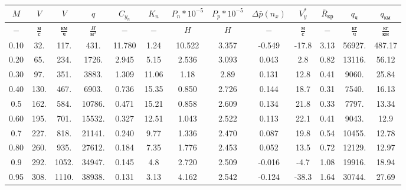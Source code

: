 \begin{tabular}{|c|c|c|c|c|c|c|c|c|c|c|c|c|}
\hline
$M$ & $V$ & $V$ & $q$ & $C_{y_n}$ & $K_n$ & $P_n*10^{-5}$ & $P_p*10^{-5}$ & $\Delta \bar{p}(n_x)$ & $V_y^*$ & $\bar{R}_{кр}$ & $q_{ч}$ & $q_{км}$ \\ 
\hline
$-$ & $\frac{м}{с}$ & $\frac{км}{ч}$ & $\frac{H}{м^2}$ & $-$ & $-$ & $H$ & $H$ & $-$ & $\frac{м}{с}$ & $-$ & $\frac{кг}{ч}$ & $\frac{кг}{км}$ \\ 
\hline
0.10 & 32. & 117. & 431. & 11.780 & 1.24 & 10.522 & 3.357 & -0.549 & -17.8 & 3.13 & 56927. & 487.17 \\ 
\hline
0.20 & 65. & 234. & 1726. & 2.945 & 5.15 & 2.536 & 3.093 & 0.043 & 2.8 & 0.82 & 13116. & 56.12 \\ 
\hline
0.30 & 97. & 351. & 3883. & 1.309 & 11.06 & 1.18 & 2.89 & 0.131 & 12.8 & 0.41 & 9060. & 25.84 \\ 
\hline
0.40 & 130. & 467. & 6903. & 0.736 & 15.35 & 0.850 & 2.726 & 0.144 & 18.7 & 0.31 & 7540. & 16.13 \\ 
\hline
0.5 & 162. & 584. & 10786. & 0.471 & 15.21 & 0.858 & 2.609 & 0.134 & 21.8 & 0.33 & 7797. & 13.34 \\ 
\hline
0.60 & 195. & 701. & 15532. & 0.327 & 12.51 & 1.043 & 2.522 & 0.113 & 22.1 & 0.41 & 9043. & 12.9 \\ 
\hline
0.7 & 227. & 818. & 21141. & 0.240 & 9.77 & 1.336 & 2.470 & 0.087 & 19.8 & 0.54 & 10455. & 12.78 \\ 
\hline
0.80 & 260. & 935. & 27612. & 0.184 & 7.35 & 1.776 & 2.453 & 0.052 & 13.5 & 0.72 & 12129. & 12.97 \\ 
\hline
0.9 & 292. & 1052. & 34947. & 0.145 & 4.8 & 2.720 & 2.509 & -0.016 & -4.7 & 1.08 & 19916. & 18.94 \\ 
\hline
0.95 & 308. & 1110. & 38938. & 0.131 & 3.13 & 4.162 & 2.542 & -0.124 & -38.3 & 1.64 & 30744. & 27.69 \\ 
\hline
\end{tabular}